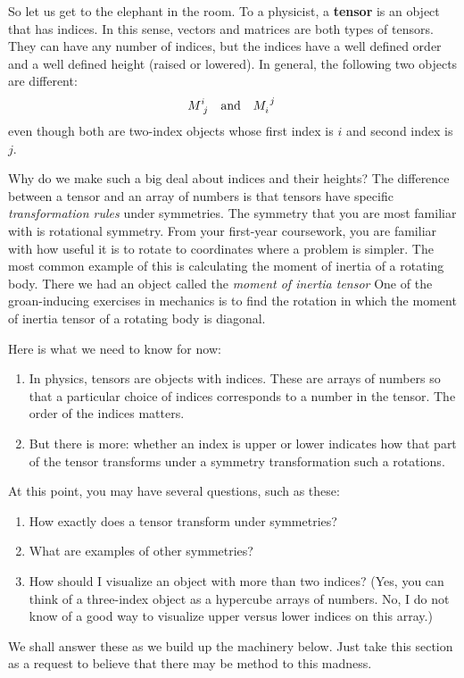 \documentclass[12pt, oneside]{report}    %
\begin{document}
So let us get to the elephant in the room. To a physicist, a \textbf{tensor} is an object that has indices. In this sense, vectors and matrices are both types of tensors. They can have any number of indices, but the indices have a well defined order and a well defined height (raised or lowered). In general, the following two objects are different:
\begin{align}
    M\aij{i}{j} &&\text{and} && M_i^{\phantom{i}j} \,
\end{align}
even though both are two-index objects whose first index is $i$ and second index is $j$. 

Why do we make such a big deal about indices and their heights? The difference between a tensor and an array of numbers is that tensors have specific \emph{transformation rules} under symmetries. The symmetry that you are most familiar with is rotational symmetry. From your first-year coursework, you are familiar with how useful it is to rotate to coordinates where a problem is simpler. The most common example of this is calculating the moment of inertia of a rotating body. There we had an object called the \emph{moment of inertia tensor} One of the groan-inducing exercises in mechanics is to find the rotation in which the moment of inertia tensor of a rotating body is diagonal.

Here is what we need to know for now:
\begin{enumerate}
    \item In physics, tensors are objects with indices. These are arrays of numbers so that a particular choice of indices corresponds to a number in the tensor. The order of the indices matters.
    \item But there is more: whether an index is upper or lower indicates how that part of the tensor transforms under a symmetry transformation such a rotations. 
\end{enumerate}
At this point, you may have several questions, such as these:
\begin{enumerate}
    \item How exactly does a tensor transform under symmetries?
    \item What are examples of other symmetries?
    \item How should I visualize an object with more than two indices? (Yes, you can think of a three-index object as a hypercube arrays of numbers. No, I do not know of a good way to visualize upper versus lower indices on this array.)
\end{enumerate}
We shall answer these as we build up the machinery below. Just take this section as a request to believe that there may be method to this madness.
\end{document}
